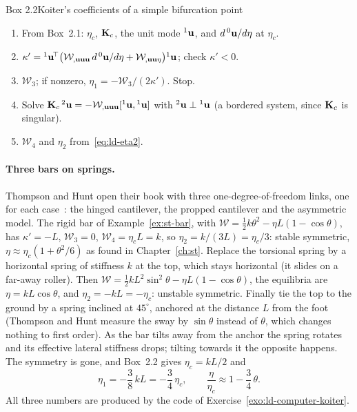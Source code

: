 \begin{gbox}{Box 2.2\quad Koiter's coefficients of a simple bifurcation point}\label{sec:ld-box-koiter}
%
\begin{enumerate}
  \item From Box~2.1: $\eta_c$, $\mathbf{K}_c$, the unit mode ${}^1\mathbf{u}$, and
        $d\,{}^0\mathbf{u}/d\eta$ at $\eta_c$.
  \item $\kappa' = {}^1\mathbf{u}^{\!\top}\bigl(\mathcal{W}_{,\mathbf{u}\mathbf{u}\mathbf{u}}\,d\,{}^0\mathbf{u}/d\eta
        + \mathcal{W}_{,\mathbf{u}\mathbf{u}\eta}\bigr){}^1\mathbf{u}$; check $\kappa' < 0$.
  \item $\mathcal{W}_3$; if nonzero, $\eta_1 = -\mathcal{W}_3/(2\kappa')$. Stop.
  \item Solve $\mathbf{K}_c\,{}^2\mathbf{u} = -\mathcal{W}_{,\mathbf{u}\mathbf{u}\mathbf{u}}[{}^1\mathbf{u},{}^1\mathbf{u}]$
        with ${}^2\mathbf{u}\perp{}^1\mathbf{u}$ (a bordered system, since $\mathbf{K}_c$ is singular).
  \item $\mathcal{W}_4$ and $\eta_2$ from~\eqref{eq:ld-eta2}.
\end{enumerate}
\end{gbox}

\paragraph{Three bars on springs.}
%
Thompson and Hunt open their book with three one-degree-of-freedom links, one for each
case~\cite[Section~1.2]{ld-thompson1973}: the hinged cantilever, the propped
cantilever and the asymmetric model. The rigid bar of Example~\ref{ex:st-bar}, with $\mathcal{W} = \tfrac12 k\theta^2 - \eta L(1 - \cos\theta)$,
has $\kappa' = -L$, $\mathcal{W}_3 = 0$, $\mathcal{W}_4 = \eta_c L = k$, so
$\eta_2 = k/(3L) = \eta_c/3$: stable symmetric, $\eta \approx \eta_c(1 + \theta^2/6)$
as found in Chapter~\ref{ch:st}. Replace the torsional spring by a horizontal spring
of stiffness $k$ at the top, which stays horizontal (it slides on a far-away
roller). Then $\mathcal{W} = \tfrac12 k L^2\sin^2\theta - \eta L(1 - \cos\theta)$, the
equilibria are $\eta = kL\cos\theta$, and $\eta_2 = -kL = -\eta_c$: unstable
symmetric. Finally tie the top to the ground by a spring inclined at $45^\circ$,
anchored at the distance $L$ from the foot (Thompson and Hunt measure the sway by
$\sin\theta$ instead of $\theta$, which changes nothing to first order). As the bar tilts
away from the anchor the spring rotates and its effective lateral stiffness drops;
tilting towards it the opposite happens. The symmetry is gone, and
Box~2.2 gives $\eta_c = kL/2$ and
\begin{equation}\label{eq:ld-inclined}
  \eta_1 = -\frac{3}{8}\,kL = -\frac34\,\eta_c,
  \qquad \frac{\eta}{\eta_c} \approx 1 - \frac34\,\theta .
\end{equation}
All three numbers are produced by the code of Exercise~\ref{exo:ld-computer-koiter}.

